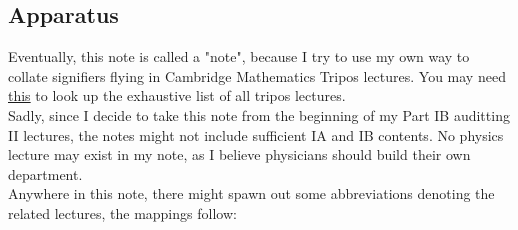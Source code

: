 \subsection{Apparatus}

Eventually, this note is called a "note", because I try to use my own way to collate signifiers flying in Cambridge Mathematics Tripos lectures. You may need \href{https://www.maths.cam.ac.uk/undergrad/files/lecturelist/current/All_Parts.pdf}{this} to look up the exhaustive list of all tripos lectures. \\

Sadly, since I decide to take this note from the beginning of my Part IB auditting II lectures, the notes might not include sufficient IA and IB contents. No physics lecture may exist in my note, as I believe physicians should build their own department.\\

Anywhere in this note, there might spawn out some abbreviations denoting the related lectures, the mappings follow:

